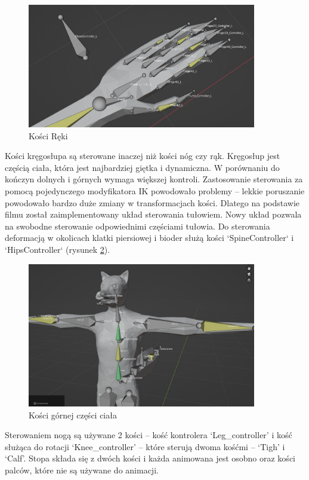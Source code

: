 \documentclass[12pt,twoside]{article}
\begin{document}
\begin{figure}[h]
    \centering
	\includegraphics[width=10cm]{RealizacjaProjektu/MC/Bones_Hand.jpg}
	\caption{Kości Ręki}
    \label{Aramature:HandBones}
\end{figure}

Kości kręgosłupa są
sterowane inaczej niż kości nóg czy rąk. Kręgosłup jest częścią ciała, która
jest najbardziej giętka i dynamiczna. W porównaniu do kończyn dolnych i górnych
wymaga większej kontroli. Zastosowanie sterowania za pomocą pojedynczego
modyfikatora IK powodowało problemy -- lekkie poruszanie powodowało bardzo duże
zmiany w transformacjach kości. Dlatego na podstawie filmu
\cite{blender_Better_Spine} został zaimplementowany układ sterowania tułowiem.
Nowy układ pozwala na swobodne sterowanie odpowiednimi częściami tułowia.
Do sterowania deformacją w okolicach klatki piersiowej i bioder służą kości
`SpineController` i `HipsController` (rysunek \ref{Aramature:UpperBody}). 

\begin{figure}[h]
    \centering
	\includegraphics[width=10cm]{RealizacjaProjektu/MC/Bones_upperBody.jpg}
	\caption{Kości górnej części ciała}
    \label{Aramature:UpperBody}
\end{figure}

Sterowaniem nogą są używane 2 kości -- kość kontrolera `Leg\_controller' i kość
służąca do rotacji `Knee\_controller' -- które sterują dwoma kośćmi -- `Tigh' i
`Calf'. Stopa składa się z dwóch kości i każda animowana jest osobno oraz kości
palców, które nie są używane do animacji. 
\end{document}
